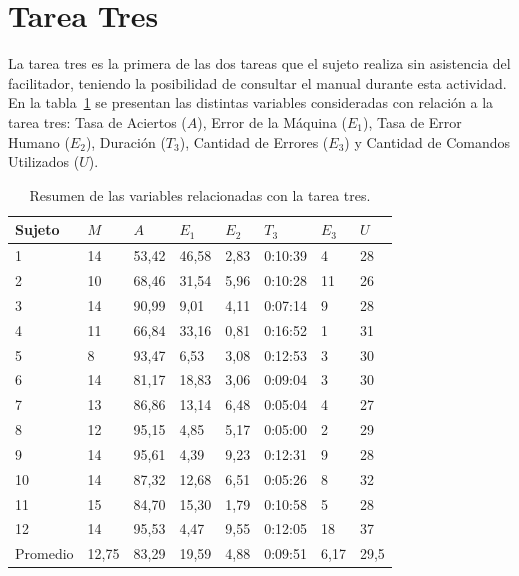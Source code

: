 \section{Tarea Tres}

La tarea tres es la primera de las dos tareas que el sujeto realiza sin asistencia del facilitador,
teniendo la posibilidad de consultar el manual durante esta actividad.
En la tabla~\ref{sec:tabla-tarea3} se presentan las distintas variables consideradas con relaci\'on
a la tarea tres: Tasa de Aciertos ($A$), Error de la M\'aquina ($E_1$),  
Tasa de Error Humano ($E_2$), Duraci\'on ($T_3$), Cantidad de Errores ($E_3$) y Cantidad de Comandos Utilizados ($U$).

\begin{table}[H]
\centering
\footnotesize
\begin{tabular}{|p{1.6cm}|p{1.6cm}|p{1.6cm}|p{1.6cm}|p{1.6cm}|p{1.6cm}|p{1.6cm}|p{1.6cm}|}
\hline
    Sujeto & $M$ &  $A$     & $E_1$    & $E_2$   & $T_3$      & $E_3$  & $U$ \\
    \hline 
    1  & 14  & 53,42  & 46,58  & 2,83 & 0:10:39 & 4  &  28 \\
    2  & 10  & 68,46  & 31,54  & 5,96 & 0:10:28 & 11 &  26 \\
    3  & 14  & 90,99  & 9,01   & 4,11 & 0:07:14 & 9  &  28 \\
    4  & 11  & 66,84  & 33,16  & 0,81 & 0:16:52 & 1  &  31 \\
    5  & 8   & 93,47  & 6,53   & 3,08 & 0:12:53 & 3  &  30 \\
    6  & 14  & 81,17  & 18,83  & 3,06 & 0:09:04 & 3  &  30 \\
    7  & 13  & 86,86  & 13,14  & 6,48 & 0:05:04 & 4  &  27 \\
    8  & 12  & 95,15  & 4,85   & 5,17 & 0:05:00 & 2  &  29 \\
    9  & 14  & 95,61  & 4,39   & 9,23 & 0:12:31 & 9  &  28 \\
    10 & 14  & 87,32  & 12,68  & 6,51 & 0:05:26 & 8  &  32 \\
    11 & 15  & 84,70  & 15,30  & 1,79 & 0:10:58 & 5  &  28 \\
    12 & 14  & 95,53  & 4,47   & 9,55 & 0:12:05 & 18 &  37 \\
\hline
  Promedio & 12,75 & 83,29   & 19,59 & 4,88 & 0:09:51 & 6,17  & 29,5   \\
\hline
\end{tabular}
\caption{Resumen de las variables relacionadas con la tarea tres.}
\label{sec:tabla-tarea3}
\end{table}

